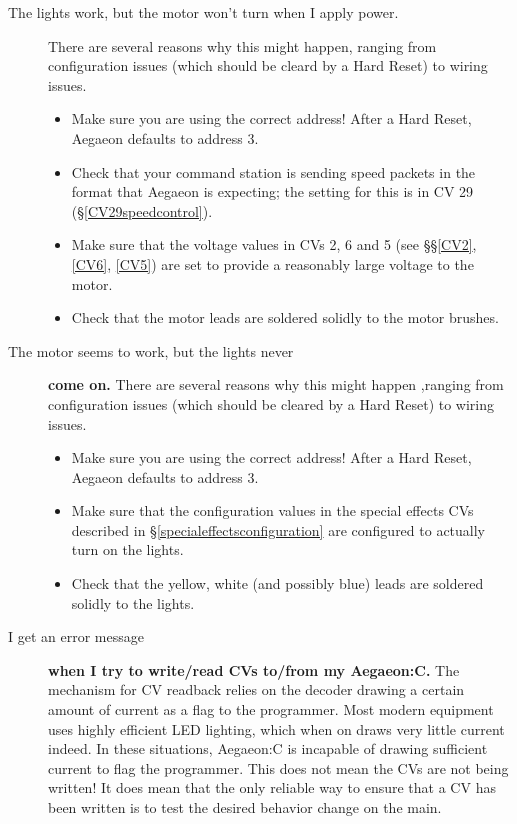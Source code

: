 \documentclass[12pt,letterpaper,draft]{memoir} %
\begin{document}
\begin{description}
\item[The lights work, but the motor won't turn when I apply power.] There are several reasons why this might happen, ranging from configuration issues (which should be cleard by a Hard Reset) to wiring issues.

	\begin{itemize}
	\item Make sure you are using the correct address! After a Hard Reset, Aegaeon defaults to address 3.
	\item Check that your command station is sending speed packets in the format that Aegaeon is expecting; the setting for this is in CV 29 (\S\ref{CV29speedcontrol}).
   \item Make sure that the voltage values in CVs 2, 6 and 5 (see \S\S\ref{CV2}, \ref{CV6}, \ref{CV5}) are set to provide a reasonably large voltage to the motor.
	\item Check that the motor leads are soldered solidly to the motor brushes.
	\end{itemize}

\item[The motor seems to work, but the lights never] \textbf{come on.} There are several reasons why this might happen ,ranging from configuration issues (which should be cleared by a Hard Reset) to wiring issues.

	\begin{itemize}
	\item Make sure you are using the correct address! After a Hard Reset, Aegaeon defaults to address 3.
   \item Make sure that the configuration values in the special effects CVs described in \S\ref{specialeffectsconfiguration} are configured to actually turn on the lights.
	\item Check that the yellow, white (and possibly blue) leads are soldered solidly to the lights.
	\end{itemize}

\item[I get an error message] \textbf{when I try to write/read CVs to/from my Aegaeon:C.} The mechanism for CV readback relies on the decoder drawing a certain amount of current as a flag to the programmer. Most modern equipment uses highly efficient LED lighting, which when on draws very little current indeed. In these situations, Aegaeon:C is incapable of drawing sufficient current to flag the programmer. This does not mean the CVs are not being written! It does mean that the only reliable way to ensure that a CV has been written is to test the desired behavior change on the main.

\end{description}
\end{document}
